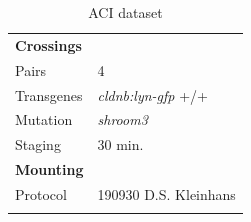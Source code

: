\documentclass[11pt,singlespacinge,twoside]{reedthesis} %
\begin{document}
\begin{longtable}[]{@{}ll@{}}
\caption{\label{tab:acidata} ACI dataset}\tabularnewline
\toprule
\endhead
\begin{minipage}[t]{0.21\columnwidth}\raggedright
\textbf{Crossings}\strut
\end{minipage} & \begin{minipage}[t]{0.73\columnwidth}\raggedright
\strut
\end{minipage}\tabularnewline
\begin{minipage}[t]{0.21\columnwidth}\raggedright
Pairs\strut
\end{minipage} & \begin{minipage}[t]{0.73\columnwidth}\raggedright
4\strut
\end{minipage}\tabularnewline
\begin{minipage}[t]{0.21\columnwidth}\raggedright
Transgenes\strut
\end{minipage} & \begin{minipage}[t]{0.73\columnwidth}\raggedright
\emph{cldnb:lyn-gfp} +/+\strut
\end{minipage}\tabularnewline
\begin{minipage}[t]{0.21\columnwidth}\raggedright
Mutation\strut
\end{minipage} & \begin{minipage}[t]{0.73\columnwidth}\raggedright
\emph{shroom3}\strut
\end{minipage}\tabularnewline
\begin{minipage}[t]{0.21\columnwidth}\raggedright
Staging\strut
\end{minipage} & \begin{minipage}[t]{0.73\columnwidth}\raggedright
30 min.\strut
\end{minipage}\tabularnewline
\begin{minipage}[t]{0.21\columnwidth}\raggedright
\textbf{Mounting}\strut
\end{minipage} & \begin{minipage}[t]{0.73\columnwidth}\raggedright
\strut
\end{minipage}\tabularnewline
\begin{minipage}[t]{0.21\columnwidth}\raggedright
Protocol\strut
\end{minipage} & \begin{minipage}[t]{0.73\columnwidth}\raggedright
190930 D.S. Kleinhans\strut
\end{minipage}\tabularnewline
\begin{minipage}[t]{0.21\columnwidth}\raggedright

\end{minipage}
\end{longtable}
\end{document}

